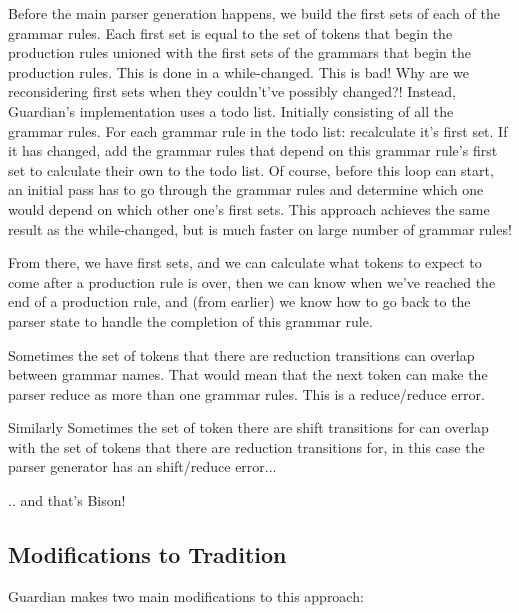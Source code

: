 {{		Before the main parser generation happens, we build the first sets of
		each of the grammar rules. Each first set is equal to the set of tokens
		that begin the production rules unioned with the first sets of the grammars
		that begin the production rules. This is done in a while-changed.
		This is bad! Why are we reconsidering first sets when they couldn't've
		possibly changed?! Instead, Guardian's implementation uses a todo list.
		Initially consisting of all the grammar rules. For each grammar rule in
		the todo list: recalculate it's first set. If it has changed, add the
		grammar rules that depend on this grammar rule's first set to calculate
		their own to the todo list. Of course, before this loop can start,
		an initial pass has to go through the grammar rules and determine which
		one would depend on which other one's first sets. This approach
		achieves the same result as the while-changed, but is much faster on
		large number of grammar rules!

		From there, we have first sets, and we can calculate what tokens to expect to come
		after a production rule is over, then we can know when we've reached the
		end of a production rule, and (from earlier) we know how to go back to
		the parser state to handle the completion of this grammar rule.

		Sometimes the set of tokens that there are reduction transitions can overlap
		between grammar names. That would mean that the next token can make
		the parser reduce as more than one grammar rules. This is a reduce/reduce
		error.

		Similarly Sometimes the set of token there are shift transitions for can overlap with
		the set of tokens that there are reduction transitions for, in this case
		the parser generator has an shift/reduce error...

		.. and that's Bison!
	
	}
	
	\subsection{Modifications to Tradition}
	{
		Guardian makes two main modifications to this approach:
		
}}
